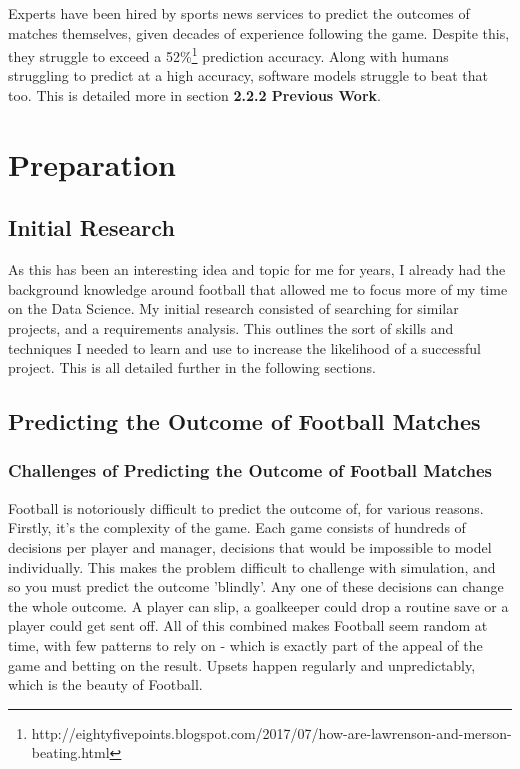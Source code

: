 \documentclass[12pt,a4paper,twoside,openright]{report}
\begin{document}
Experts have been hired by sports news services to predict the outcomes of matches themselves, given decades of experience following the game. Despite this, they struggle to exceed a 52\%\footnote{http://eightyfivepoints.blogspot.com/2017/07/how-are-lawrenson-and-merson-beating.html} prediction accuracy. Along with humans struggling to predict at a high accuracy, software models struggle to beat that too. This is detailed more in section \textbf{2.2.2 Previous Work}.

\chapter{Preparation}

\section{Initial Research}

As this has been an interesting idea and topic for me for years, I already had the background knowledge around football that allowed me to focus more of my time on the Data Science. My initial research consisted of searching for similar projects, and a requirements analysis. This outlines the sort of skills and techniques I needed to learn and use to increase the likelihood of a successful project. This is all detailed further in the following sections.
    
\section{Predicting the Outcome of Football Matches}

\subsection{Challenges of Predicting the Outcome of Football Matches}

Football is notoriously difficult to predict the outcome of, for various reasons. Firstly, it's the complexity of the game. Each game consists of hundreds of decisions per player and manager, decisions that would be impossible to model individually. This makes the problem difficult to challenge with simulation, and so you must predict the outcome 'blindly'. Any one of these decisions can change the whole outcome. A player can slip, a goalkeeper could drop a routine save or a player could get sent off. All of this combined makes Football seem random at time, with few patterns to rely on - which is exactly part of the appeal of the game and betting on the result. Upsets happen regularly and unpredictably, which is the beauty of Football.
\end{document}
